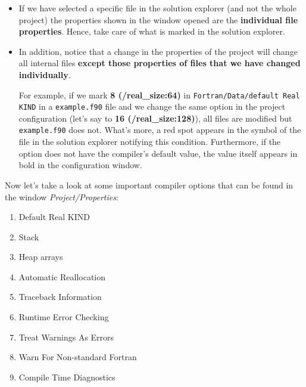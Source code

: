 \begin{IN}
    \begin{itemize}  
        \item If we have selected a specific file in the solution explorer (and not the whole project) the properties shown in the window opened are the \textbf{individual file properties}. Hence, take care of what is marked in the solution explorer.
        
        \item In addition, notice that a change in the properties of the project will change all internal files \textbf{except those properties of files that we have changed individually}. 
        
        For example, if we mark \textbf{8 (/real\_size:64)} in \texttt{Fortran/Data/default Real KIND} in a \texttt{example.f90} file and we change the same option in the project configuration (let's say to \textbf{16 (/real\_size:128)}), all files are modified but \texttt{example.f90} does not. What's more, a red spot appears in the symbol of the file in the solution explorer notifying this condition. Furthermore, if the option does not have the compiler's default value, the value itself appears in bold in the configuration window.
    \end{itemize}
\end{IN}

Now let's take a look at some important compiler options that can be found in the window \textit{Project/Properties}:

\begin{enumerate}[nosep]
    \item Default Real KIND
    \item Stack
    \item Heap arrays
    \item Automatic Reallocation
    \item Traceback Information
    \item Runtime Error Checking
    \item Treat Warnings As Errors
    \item Warn For Non-standard Fortran
    \item Compile Time Diagnostics
\end{enumerate}



